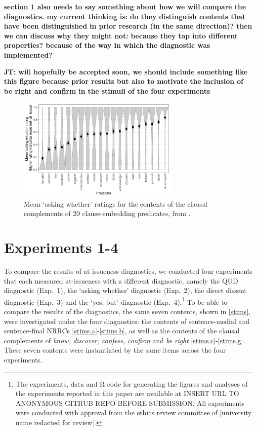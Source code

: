\documentclass[times,linguex,xcolor]{glossa}
\begin{document}
    {\bf section 1 also needs to say something about how we will compare the diagnostics. my current thinking is: do they distinguish contents that have been distinguished in prior research (in the same direction)? then we can discuss why they might not: because they tap into different properties? because of the way in which the diagnostic was implemented?} 

{\bf JT: \citealt{degen-tonhauser-glossa} will hopefully be accepted soon, we should include something like this figure because prior results but also to motivate the inclusion of be right and confirm in the stimuli of the four experiments}
    
\begin{figure}[h!]
  \centering

\includegraphics[width=0.7\textwidth]{../../results/main/degen-tonhauser-glossa/graphs/mean-asking-whether-ratings.pdf}

  \caption{Mean `asking whether' ratings for the contents of the clausal complements of 20 clause-embedding predicates, from \citealt{degen-tonhauser-glossa}.}
  \label{fig:dtglossa}
  \end{figure}

\section{Experiments 1-4 \label{sec:2_experiments}}

  To compare the results of at-issueness diagnostics, we conducted four experiments that each measured at-issueness with a different diagnostic, namely the QUD diagnostic (Exp.~1), the `asking whether' diagnostic (Exp.~2), the direct dissent diagnostic (Exp.~3) and the `yes, but' diagnostic (Exp.~4).\footnote{The experiments, data and R code for generating the figures and analyses of the experiments reported in this paper are available at INSERT URL TO ANONYMOUS GITHUB REPO BEFORE SUBMISSION. All experiments were conducted with approval from the ethics review committee of [university name redacted for review].} To be able to compare the results of the diagnostics, the same seven contents, shown in \ref{stims}, were investigated under the four diagnostics: the contents of sentence-medial and sentence-final NRRCs \ref{stims.a}-\ref{stims.b}, as well as the contents of the clausal complements of \emph{know, discover, confess, confirm} and \emph{be right} \ref{stims.c}-\ref{stims.g}. These seven contents were instantiated by the same items across the four experiments.
\end{document}
